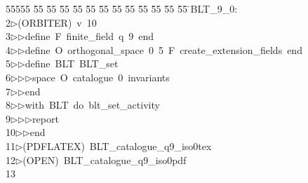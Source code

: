 %
%
\begin{tabbing}
55555 \= 55 \= 55 \= 55 \= 55 \= 55 \= 55 \= 55 \= 55 \= 55 \= 55 \= 55 \= 55 \= \>BLT\_9\_0:\\[0pt]
2\>$\triangleright$\>(ORBITER)\ v\ 10\ \\[0pt]
3\>$\triangleright$\>$\triangleright$\>define\ F\ finite\_field\ q\ 9\ end\ \\[0pt]
4\>$\triangleright$\>$\triangleright$\>define\ O\ orthogonal\_space\ 0\ 5\ F\ create\_extension\_fields\ end\ \\[0pt]
5\>$\triangleright$\>$\triangleright$\>define\ BLT\ BLT\_set\ \\[0pt]
6\>$\triangleright$\>$\triangleright$\>$\triangleright$\>space\ O\ catalogue\ 0\ invariants\ \\[0pt]
7\>$\triangleright$\>$\triangleright$\>end\ \\[0pt]
8\>$\triangleright$\>$\triangleright$\>with\ BLT\ do\ blt\_set\_activity\ \\[0pt]
9\>$\triangleright$\>$\triangleright$\>$\triangleright$\>report\ \\[0pt]
10\>$\triangleright$\>$\triangleright$\>end\\[0pt]
11\>$\triangleright$\>(PDFLATEX)\ BLT\_catalogue\_q9\_iso0tex\\[0pt]
12\>$\triangleright$\>(OPEN)\ BLT\_catalogue\_q9\_iso0pdf\\[0pt]
13\>\end{tabbing}
